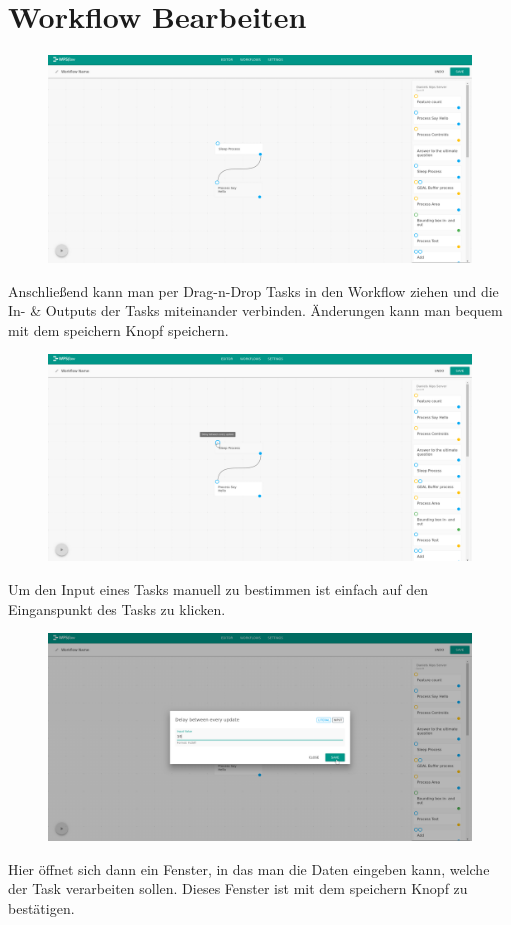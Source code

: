 \chapter{Workflow Bearbeiten}
    \begin{figure}[H]
        \centering
        \includegraphics[width=15.5cm]{images/Create Workflow.png}
        \label{create_workflow}
    \end{figure}
    Anschließend kann man per Drag-n-Drop Tasks in den Workflow ziehen und die In- \& Outputs der Tasks miteinander verbinden. Änderungen kann man bequem mit dem speichern Knopf speichern. 
    \begin{figure}[H]
        \centering
        \includegraphics[width=15.5cm]{images/Add Input 1.png}
        \label{add_input_1}
    \end{figure}
    \noindent Um den Input eines Tasks manuell zu bestimmen ist einfach auf den Einganspunkt des Tasks zu klicken.
    \begin{figure}[H]
        \centering
        \includegraphics[width=15.5cm]{images/Add Input 2.png}
        \label{add_input_2}
    \end{figure}
    \noindent Hier öffnet sich dann ein Fenster, in das man die Daten eingeben kann, welche der Task verarbeiten sollen. Dieses Fenster ist mit dem speichern Knopf zu bestätigen. 
